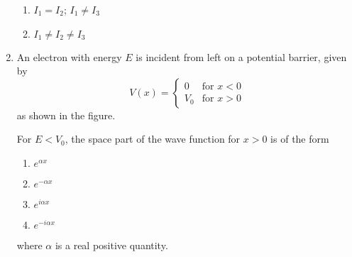 \documentclass[journal]{IEEEtran}
\begin{document}
\begin{enumerate}
\begin{enumerate}
    \item $I_1 = I_2$; $I_1 \neq I_3$
    \item $I_1 \neq I_2 \neq I_3$
\end{enumerate}
\item An electron with energy $E$ is incident from left on a potential barrier, given by
\[V(x) = \begin{cases} 
    0 & \text{for } x < 0 \\
    V_0 & \text{for } x > 0
\end{cases}\]
as shown in the figure.
\begin{figure}[H]
\centering
{}
\label{fig:my_label}
\end{figure}
For $E < V_0$, the space part of the wave function for $x > 0$ is of the form
\begin{enumerate}
    \item $e^{\alpha x}$
    \item $e^{-\alpha x}$
    \item $e^{i\alpha x}$
    \item $e^{-i\alpha x}$
\end{enumerate}
where $\alpha$ is a real positive quantity.
\end{enumerate}
\end{document}

